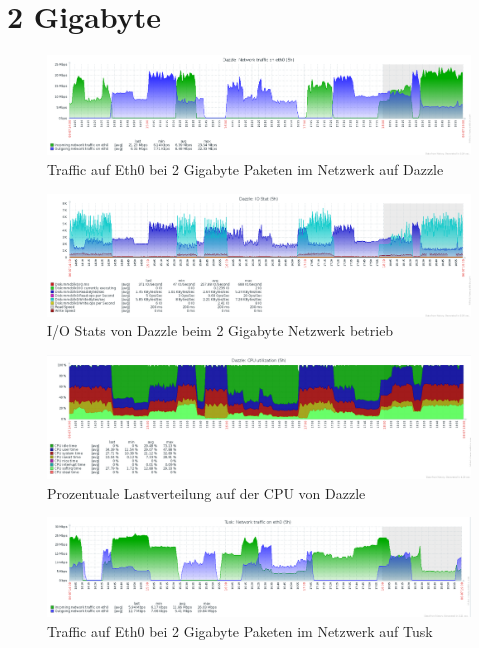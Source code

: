 \section{2 Gigabyte}


\begin{figure}[htbp]
\centering
\includegraphics*[width=0.9\linewidth, angle=90]{Abb/ZabbixDazzle/Standard/Standard2000}

\caption{Traffic auf Eth0 bei 2 Gigabyte Paketen im Netzwerk auf Dazzle}
\label{fig:Eth0Dazzle2000}
\end{figure}


\begin{figure}[htbp]
\centering
\includegraphics*[width=0.9\linewidth, angle=90]{Abb/ZabbixDazzle/Standard/IoStatStandard2000}

\caption{I/O Stats von Dazzle beim 2 Gigabyte Netzwerk betrieb}
\label{fig:IoStatDazzle2000}
\end{figure} %

\begin{figure}[htbp]
\centering
\includegraphics*[width=0.9\linewidth, angle=90]{Abb/ZabbixDazzle/Standard/CPUStandard2000}

\caption{Prozentuale Lastverteilung auf der CPU von Dazzle}
\label{fig:CPUDazzle2000}
\end{figure}

\begin{figure}[htbp]
\centering
\includegraphics*[width=0.9\linewidth, angle=90]{Abb/ZabbixTusk/Standard/Standard2000}

\caption{Traffic auf Eth0 bei 2 Gigabyte Paketen im Netzwerk auf Tusk}
\label{fig:Eth0Tusk2000}
\end{figure}


